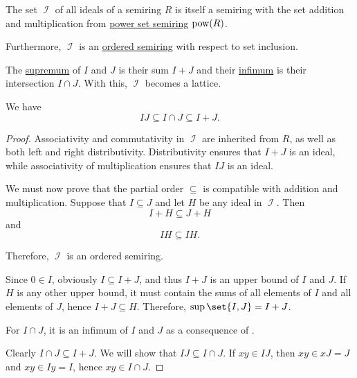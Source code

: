 \begin{proposition}\label{thm:semiring_of_ideals}
  \hfill
  \begin{thmenum}
     The set \( \mscrI \) of all ideals of a semiring \( R \) is itself a semiring with the set addition and multiplication from \hyperref[def:semiring/power_set]{power set semiring} \( \operatorname{pow}(R) \).

     Furthermore, \( \mscrI \) is an \hyperref[def:ordered_semiring]{ordered semiring} with respect to set inclusion.

     The \hyperref[def:partially_ordered_set_extremal_points/supremum_and_infimum]{supremum} of \( I \) and \( J \) is their sum \( I + J \) and their \hyperref[def:partially_ordered_set_extremal_points/supremum_and_infimum]{infimum} is their intersection \( I \cap J \). With this, \( \mscrI \) becomes a lattice.

     We have
    \begin{equation*}
      IJ \subseteq I \cap J \subseteq I + J.
    \end{equation*}
  \end{thmenum}
\end{proposition}
\begin{proof}
   Associativity and commutativity in \( \mscrI \) are inherited from \( R \), as well as both left and right distributivity. Distributivity ensures that \( I + J \) is an ideal, while associativity of multiplication ensures that \( IJ \) is an ideal.

   We must now prove that the partial order \( \subseteq \) is compatible with addition and multiplication. Suppose that \( I \subseteq J \) and let \( H \) be any ideal in \( \mscrI \). Then
  \begin{equation*}
    I + H \subseteq J + H
  \end{equation*}
  and
  \begin{equation*}
    IH \subseteq IH.
  \end{equation*}

  Therefore, \( \mscrI \) is an ordered semiring.

   Since \( 0 \in I \), obviously \( I \subseteq I + J \), and thus \( I + J \) is an upper bound of \( I \) and \( J \). If \( H \) is any other upper bound, it must contain the sums of all elements of \( I \) and all elements of \( J \), hence \( I + J \subseteq H \). Therefore, \( \sup\set{I, J} = I + J \).

  For \( I \cap J \), it is an infimum of \( I \) and \( J \) as a consequence of .

   Clearly \( I \cap J \subseteq I + J \). We will show that \( IJ \subseteq I \cap J \). If \( xy \in IJ \), then \( xy \in xJ = J \) and \( xy \in Iy = I \), hence \( xy \in I \cap J \).
\end{proof}

